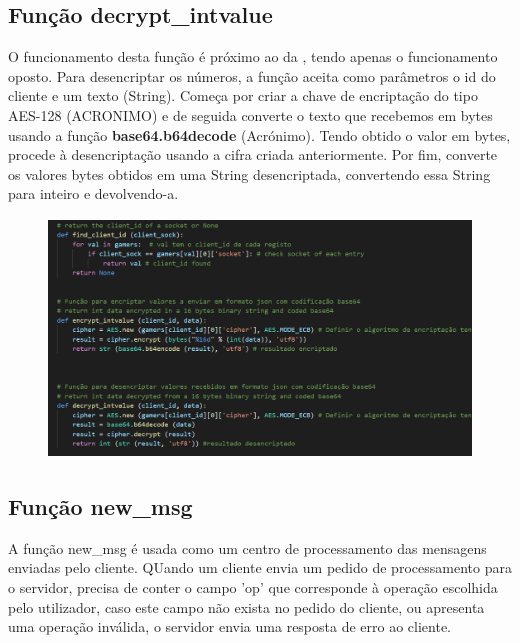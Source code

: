 \documentclass{report}
\begin{document}
\subsection{Função decrypt\_intvalue}
\label{ssec:func_decrypt_value_server}

O funcionamento desta função é próximo ao da , tendo apenas o funcionamento oposto. Para desencriptar os números, a função aceita como parâmetros o id do cliente e um texto (String). Começa por criar a chave de encriptação do tipo AES-128 (ACRONIMO) e de seguida converte o texto que recebemos em bytes usando a função \textbf{base64.b64decode} (Acrónimo). Tendo obtido o valor em bytes, procede à desencriptação usando a cifra criada anteriormente. Por fim, converte os valores bytes obtidos em uma String desencriptada, convertendo essa String para inteiro e devolvendo-a.

\begin{figure}[!h]
\center
\includegraphics[height = 180pt]{img/cryptofindid.png}
\end{figure}

\subsection{Função new\_msg}
\label{ssec:func_new_msg}

A função new\_msg é usada como um centro de processamento das mensagens enviadas pelo cliente. QUando um cliente envia um pedido de processamento para o servidor, precisa de conter o campo 'op' que corresponde à operação escolhida pelo utilizador, caso este campo não exista no pedido do cliente, ou apresenta uma operação inválida, o servidor envia uma resposta de erro ao cliente.
\end{document}
